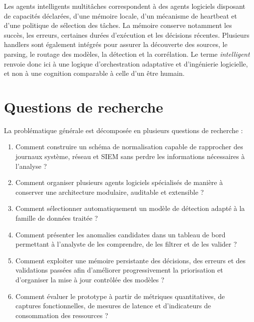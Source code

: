 Les agents intelligents multitâches correspondent à des agents logiciels disposant de capacités déclarées, d'une mémoire locale, d'un mécanisme de heartbeat et d'une politique de sélection des tâches. La mémoire conserve notamment les succès, les erreurs, certaines durées d'exécution et les décisions récentes. Plusieurs handlers sont également intégrés pour assurer la découverte des sources, le parsing, le routage des modèles, la détection et la corrélation. Le terme \textit{intelligent} renvoie donc ici à une logique d'orchestration adaptative et d'ingénierie logicielle, et non à une cognition comparable à celle d'un être humain.

\section{Questions de recherche}

La problématique générale est décomposée en plusieurs questions de recherche :

\begin{enumerate}

\item Comment construire un schéma de normalisation capable de rapprocher des journaux système, réseau et SIEM sans perdre les informations nécessaires à l'analyse ?

\item Comment organiser plusieurs agents logiciels spécialisés de manière à conserver une architecture modulaire, auditable et extensible ?

\item Comment sélectionner automatiquement un modèle de détection adapté à la famille de données traitée ?

\item Comment présenter les anomalies candidates dans un tableau de bord permettant à l'analyste de les comprendre, de les filtrer et de les valider ?

\item Comment exploiter une mémoire persistante des décisions, des erreurs et des validations passées afin d'améliorer progressivement la priorisation et d'organiser la mise à jour contrôlée des modèles ?

\item Comment évaluer le prototype à partir de métriques quantitatives, de captures fonctionnelles, de mesures de latence et d'indicateurs de consommation des ressources ?

\end{enumerate}

